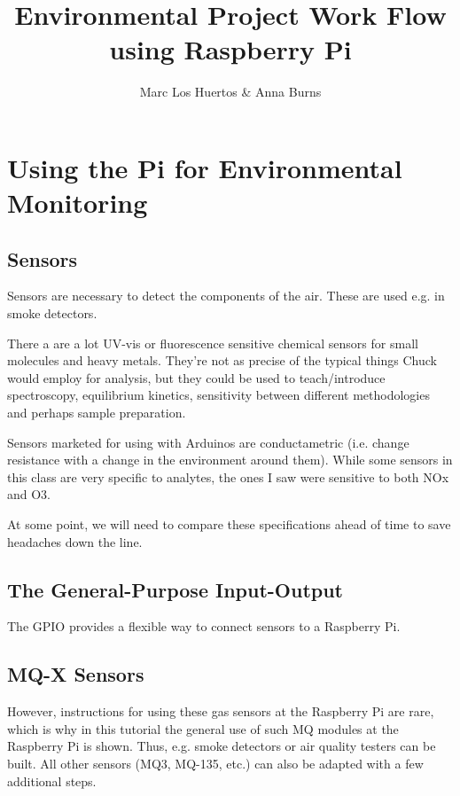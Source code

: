 \documentclass{article}\usepackage[]{graphicx}\usepackage[]{color}
\title{Environmental Project Work Flow using Raspberry Pi}
\author{Marc Los Huertos \& Anna Burns}
\begin{document}
\maketitle

\section{Using the Pi for Environmental Monitoring}

\subsection{Sensors}

Sensors are necessary to detect the components of the air. These are used e.g. in smoke detectors. 

There a are a lot UV-vis or fluorescence sensitive chemical sensors for small molecules and heavy metals. They're not as precise of the typical things Chuck would employ for analysis, but they could be used to teach/introduce  spectroscopy, equilibrium kinetics,  sensitivity between different methodologies and perhaps sample preparation.  

Sensors marketed for using with Arduinos are conductametric (i.e. change resistance with a change in the environment around them). While some sensors in this class are very specific to analytes, the ones I saw were sensitive to both NOx and O3. 

At some point, we will need to compare these specifications ahead of time to save headaches down the line.

\subsection{The General-Purpose Input-Output}

The GPIO provides a flexible way to connect sensors to a Raspberry Pi. 

\subsection{MQ-X Sensors}

However, instructions for using these gas sensors at the Raspberry Pi are rare, which is why in this tutorial the general use of such MQ modules at the Raspberry Pi is shown. Thus, e.g. smoke detectors or air quality testers can be built. All other sensors (MQ3, MQ-135, etc.) can also be adapted with a few additional steps.
\end{document}
